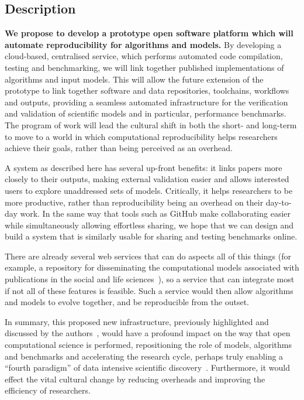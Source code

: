\documentclass[a4paper,11pt]{article}
\begin{document}
\subsection*{Description}
{\textbf{We propose to develop a prototype open software platform
which will automate reproducibility for algorithms and models.}} By developing a cloud-based, centralised service, which
performs automated code compilation, testing and benchmarking, we will
link together published implementations of algorithms and input
models. This will allow the future extension of the prototype to link
together software and data repositories, toolchains, workflows and
outputs, providing a seamless automated infrastructure for the
verification and validation of scientific models and in particular,
performance benchmarks. The program of work will lead the cultural
shift in both the short- and long-term to move to a world in which
computational reproducibility helps researchers achieve their goals,
rather than being perceived as an overhead.

A system as described here has several up-front benefits: it links
papers more closely to their outputs, making external validation
easier and allows interested users to explore unaddressed sets of
models. Critically, it helps researchers to be more productive, rather
than reproducibility being an overhead on their day-to-day work. In
the same way that tools such as GitHub make collaborating easier while
simultaneously allowing effortless sharing, we hope that we can design
and build a system that is similarly usable for sharing and testing
benchmarks online.

There are already several web services that can do aspects all of this
things (for example, a repository for disseminating the computational
models associated with publications in the social and life
sciences~\cite{rollins-et-al:2014}), so a service that can integrate
most if not all of these features is feasible. Such a service would
then allow algorithms and models to evolve together, and be
reproducible from the outset.

In summary, this proposed new infrastructure, previously highlighted
and discussed by the
authors~\cite{crick-et-al_wssspe2,crick-et-al_recomp2014}, would have
a profound impact on the way that open computational science is
performed, repositioning the role of models, algorithms and benchmarks
and accelerating the research cycle, perhaps truly enabling a ``fourth
paradigm'' of data intensive scientific
discovery~\cite{hey:2009}. Furthermore, it would effect the vital
cultural change by reducing overheads and improving the efficiency of
researchers.
\end{document}
